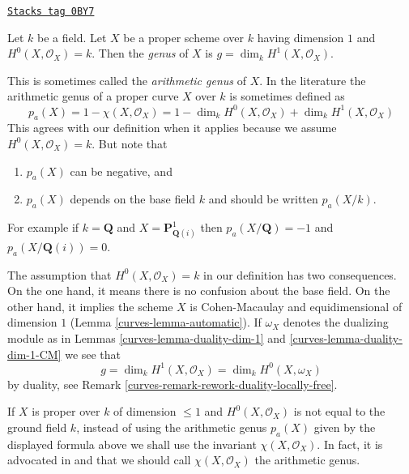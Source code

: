 \begin{definition}[Genus]
\label{curves-definition-genus}
\href{https://stacks.math.columbia.edu/tag/0BY7}{\texttt{Stacks tag 0BY7}}

Let $k$ be a field. Let $X$ be a proper scheme over $k$ having
dimension $1$ and $H^0(X, \mathcal{O}_X) = k$.
Then the {\it genus} of $X$ is $g = \dim_k H^1(X, \mathcal{O}_X)$.
\end{definition}

This is sometimes called the {\it arithmetic genus} of $X$.
In the literature the arithmetic genus of a proper curve $X$
over $k$ is sometimes defined as
$$
p_a(X) = 1 - \chi(X, \mathcal{O}_X) =
1 - \dim_k H^0(X, \mathcal{O}_X) + \dim_k H^1(X, \mathcal{O}_X)
$$
This agrees with our definition when it applies because we assume
$H^0(X, \mathcal{O}_X) = k$. But note that
\begin{enumerate}
\item $p_a(X)$ can be negative, and
\item $p_a(X)$ depends on the base field $k$ and should be written $p_a(X/k)$.
\end{enumerate}
For example if $k = \mathbf{Q}$
and $X = \mathbf{P}^1_{\mathbf{Q}(i)}$ then
$p_a(X/\mathbf{Q}) = -1$ and $p_a(X/\mathbf{Q}(i)) = 0$.

\medskip\noindent
The assumption that $H^0(X, \mathcal{O}_X) = k$ in our definition has
two consequences. On the one hand, it means there is no confusion about
the base field. On the other hand, it implies the scheme $X$ is
Cohen-Macaulay and equidimensional of dimension $1$
(Lemma \ref{curves-lemma-automatic}). If $\omega_X$ denotes the dualizing
module as in Lemmas \ref{curves-lemma-duality-dim-1} and
\ref{curves-lemma-duality-dim-1-CM} we see that
\begin{equation}
\label{equation-genus}
g = \dim_k H^1(X, \mathcal{O}_X) = \dim_k H^0(X, \omega_X)
\end{equation}
by duality, see Remark \ref{curves-remark-rework-duality-locally-free}.

\medskip\noindent
If $X$ is proper over $k$ of dimension $\leq 1$ and $H^0(X, \mathcal{O}_X)$
is not equal to the ground field $k$, instead of using the arithmetic genus
$p_a(X)$ given by the displayed formula above we shall use the invariant
$\chi(X, \mathcal{O}_X)$. In fact, it is advocated in
\cite[page 276]{FAC} and \cite[Introduction]{Hirzebruch}
that we should call $\chi(X, \mathcal{O}_X)$ the arithmetic genus.

